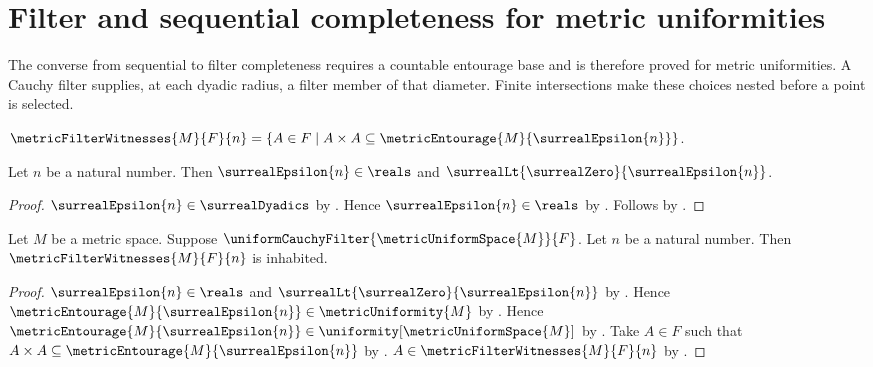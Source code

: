 






\section{Filter and sequential completeness for metric uniformities}

The converse from sequential to filter completeness requires a countable
entourage base and is therefore proved for metric uniformities.  A Cauchy
filter supplies, at each dyadic radius, a
filter member of that diameter.  Finite intersections make these choices
nested before a point is selected.

\begin{definition}\label{metric_filter_witnesses}
    $\metricFilterWitnesses{M}{F}{n}=
        \{A\in F\mid
            A\times A\subseteq
                \metricEntourage{M}{\surrealEpsilon{n}}\}$.
\end{definition}

\begin{proposition}\label{surreal_epsilon_is_positive_real}
    Let $n$ be a natural number.
    Then $\surrealEpsilon{n}\in\reals$ and
        $\surrealLt{\surrealZero}{\surrealEpsilon{n}}$.
\end{proposition}
\begin{proof}
    $\surrealEpsilon{n}\in\surrealDyadics$
        by .
    Hence $\surrealEpsilon{n}\in\reals$
        by .
    Follows by
        .
\end{proof}

\begin{proposition}\label{metric_filter_witnesses_inhabited}
    Let $M$ be a metric space.
    Suppose $\uniformCauchyFilter{\metricUniformSpace{M}}{F}$.
    Let $n$ be a natural number.
    Then $\metricFilterWitnesses{M}{F}{n}$ is inhabited.
\end{proposition}
\begin{proof}
    $\surrealEpsilon{n}\in\reals$ and
        $\surrealLt{\surrealZero}{\surrealEpsilon{n}}$
        by .
    Hence
        $\metricEntourage{M}{\surrealEpsilon{n}}
            \in\metricUniformity{M}$
        by .
    Hence
        $\metricEntourage{M}{\surrealEpsilon{n}}
            \in\uniformity[\metricUniformSpace{M}]$
        by .
    Take $A\in F$ such that
        $A\times A\subseteq\metricEntourage{M}{\surrealEpsilon{n}}$
        by .
    $A\in\metricFilterWitnesses{M}{F}{n}$
        by .
\end{proof}

